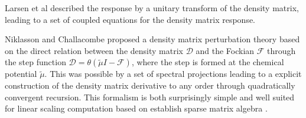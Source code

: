 \documentclass[twocolumn,showpacs,preprintnumbers,amsmath,amssymb]{revtex4}
\begin{document}

 Larsen et al \cite{Helgaker_2001} described the
 response by a unitary transform
 of the density matrix, leading to a set of coupled equations
 for the density matrix response.





 
 Niklasson and Challacombe \cite{Anders} proposed a 
 density matrix perturbation theory based on the 
 direct relation between the density matrix $\mathcal{D}$
 and the Fockian $\mathcal{F}$ through the step function 
 $\mathcal{D}=\theta(\tilde{\mu}I-\mathcal{F})$, where
 the step is formed at the chemical potential $\tilde{\mu}$.
 This was possible by a set of
 spectral projections leading to a explicit construction 
 of the density matrix derivative to any order through
 quadratically convergent recursion. This formalism is 
 both surprisingly simple and well suited for 
 linear scaling computation based on establish sparse matrix 
 algebra \cite{Matt_dbcsr}.
\end{document}
